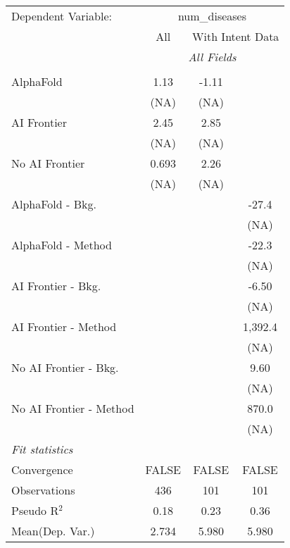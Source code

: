 \begingroup
\centering
\begin{tabular}{lccc}
   \tabularnewline \midrule \midrule
   Dependent Variable: & \multicolumn{3}{c}{num\_diseases}\\
 & \multicolumn{1}{c}{All} & \multicolumn{2}{c}{With Intent Data} \\
\cmidrule(lr){2-2} \cmidrule(lr){3-4}
 & \multicolumn{3}{c}{\textit{All Fields}} \\ \\
   AlphaFold               & 1.13  & -1.11 &   \\   
                           & (NA)  & (NA)  &   \\   
   AI Frontier             & 2.45  & 2.85  &   \\   
                           & (NA)  & (NA)  &   \\   
   No AI Frontier          & 0.693 & 2.26  &   \\   
                           & (NA)  & (NA)  &   \\   
   AlphaFold - Bkg.        &       &       & -27.4\\   
                           &       &       & (NA)\\   
   AlphaFold - Method      &       &       & -22.3\\   
                           &       &       & (NA)\\   
   AI Frontier - Bkg.      &       &       & -6.50\\   
                           &       &       & (NA)\\   
   AI Frontier - Method    &       &       & 1,392.4\\   
                           &       &       & (NA)\\   
   No AI Frontier - Bkg.   &       &       & 9.60\\   
                           &       &       & (NA)\\   
   No AI Frontier - Method &       &       & 870.0\\   
                           &       &       & (NA)\\   
   \midrule
   \emph{Fit statistics}\\
   Convergence             &FALSE  & FALSE & FALSE\\  
   Observations            & 436   & 101   & 101\\  
   Pseudo R$^2$            & 0.18  & 0.23  & 0.36\\  
Mean(Dep. Var.) & 2.734 & 5.980 & 5.980 \\
   

\end{tabular}

